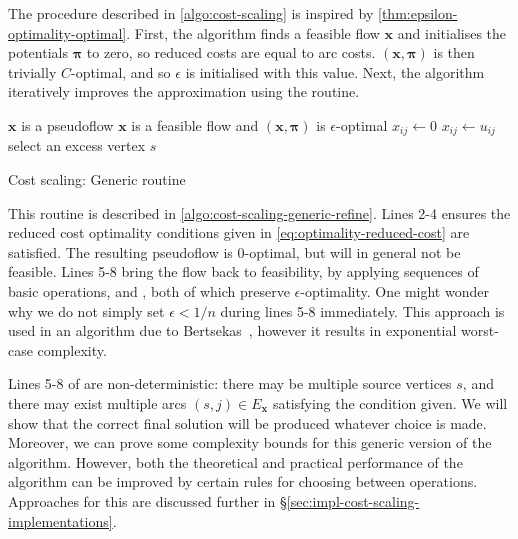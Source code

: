 The procedure described in \cref{algo:cost-scaling} is inspired by \cref{thm:epsilon-optimality-optimal}. First, the algorithm finds a feasible flow $\mathbf{x}$ and initialises the potentials $\boldsymbol{\pi}$ to zero, so reduced costs are equal to arc costs. $\left(\mathbf{x},\boldsymbol{\pi}\right)$ is then trivially $C$-optimal, and so $\epsilon$ is initialised with this value. Next, the algorithm iteratively improves the approximation using the  routine.

\begin{algorithm}
    \begin{algorithmic}[1]
        \Require $\mathbf{x}$ is a pseudoflow
        \Ensure $\mathbf{x}$ is a feasible flow and $\left(\mathbf{x},\boldsymbol{\pi}\right)$ is $\epsilon$-optimal
             
                 $x_{ij} \gets 0$ \EndIf
                 $x_{ij} \gets u_{ij}$ \EndIf
            \EndFor
             
                \State select an excess vertex $s$
                 
                \Else \enspace{}
                \EndIf
            \EndWhile
        \EndFunction
    \end{algorithmic}
    \caption{Cost scaling: Generic  routine}
    \label{algo:cost-scaling-generic-refine}
\end{algorithm}

This routine is described in \cref{algo:cost-scaling-generic-refine}. Lines 2-4 ensures the reduced cost optimality conditions given in \cref{eq:optimality-reduced-cost} are satisfied. The resulting pseudoflow is $0$-optimal, but will in general not be feasible. Lines 5-8 bring the flow back to feasibility, by applying sequences of basic operations,  and , both of which preserve $\epsilon$-optimality. One might wonder why we do not simply set $\epsilon < 1/n$ during lines 5-8 immediately. This approach is used in an algorithm due to Bertsekas~\cite{Bertsekas:1985}, however it results in exponential worst-case complexity.

Lines 5-8 of  are non-deterministic: there may be multiple source vertices $s$, and there may exist multiple arcs $(s,j) \in E_\mathbf{x}$ satisfying the condition given. We will show that the correct final solution will be produced whatever choice is made. Moreover, we can prove some complexity bounds for this generic version of the algorithm. However, both the theoretical and practical performance of the algorithm can be improved by certain rules for choosing between operations. Approaches for this are discussed further in \S\ref{sec:impl-cost-scaling-implementations}.

